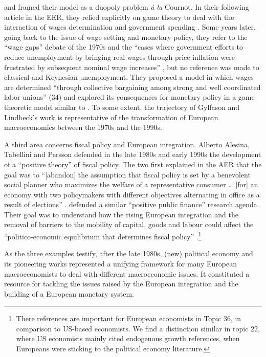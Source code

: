 \documentclass[]{elsarticle} %
\begin{document}
and framed their model as a duopoly problem \emph{à la} Cournot. In
their following article in the EER, they relied explicitly on game
theory to deal with the interaction of wages determination and
government spending \citep{gylfason1986}. Some years later, going back
to the issue of wage setting and monetary policy, they refer to the
``wage gaps'' debate of the 1970s and the ``cases where government
efforts to reduce unemployment by bringing real wages through price
inflation were frustrated by subsequent nominal wage increases''
\citep[34]{gylfason1994}, but no reference was made to classical and
Keynesian unemployment. They proposed a model in which wages are
determined ``through collective bargaining among strong and well
coordinated labor unions'' (34) and explored its consequences for
monetary policy in a game-theoretic model similar to
\citeauthor{barro1983}
\citetext{\citeyear{barro1983}; \citealp{barro1983c}}. To some extent,
the trajectory of Gylfason and Lindbeck's work is representative of the
transformation of European macroeconomics between the 1970s and the
1990s.

A third area concerns fiscal policy and European integration. Alberto
Alesina, Tabellini and Persson defended in the late 1980s and early
1990s the development of a ``positive theory'' of fiscal policy. The two
first explained in the AER that the goal was to ``{[}abandon{]} the
assumption that fiscal policy is set by a benevolent social planner who
maximizes the welfare of a representative consumer \ldots{} {[}for{]} an
economy with two policymakers with different objectives alternating in
office as a result of elections'' \citep{alesina1990}.
\citet{persson1992} defended a similar ``positive public finance''
research agenda. Their goal was to understand how the rising European
integration and the removal of barriers to the mobility of capital,
goods and labour could affect the ``politico-economic equilibrium that
determines fiscal policy'' \citep[689]{persson1992}.\footnote{There
  references are important for European economists in Topic 36, in
  comparison to US-based economists. We find a distinction similar in
  topic 22, where US economists mainly cited endogenous growth
  references, when Europeans were sticking to the political economy
  literature.}

As the three examples testify, after the late 1980s, (new) political
economy and its pioneering works
\citep{kydland1977, barro1983, barro1983c, rogoff1985b} represented a
unifying framework for many European macroeconomists to deal with
different macroeconomic issues. It constituted a resource for tackling
the issues raised by the European integration and the building of a
European monetary system.
\end{document}
